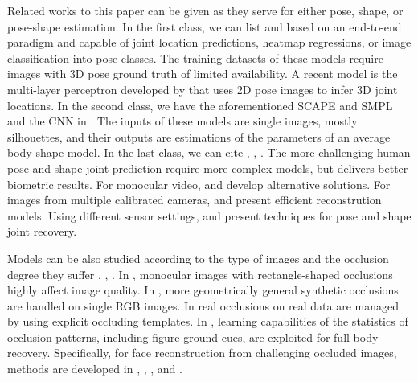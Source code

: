 \documentclass[]{interact}
\theoremstyle{plain}%
\theoremstyle{definition}
\theoremstyle{remark}
\begin{document}
Related works to this paper can be given as they serve for either pose, shape, or pose-shape estimation.  In the first class, we can list \citep{Li20143DHP, Mehta2016Monocular3H, Pavlakos2016CoarsetoFineVP} and \citep{Rogez2016MoCapguidedDA} based on an end-to-end paradigm and capable of joint location predictions, heatmap regressions, or image classification into pose classes. The training datasets of these models require images with 3D pose ground truth of limited availability. A recent model is the multi-layer perceptron developed by \citep{Martinez2017ASY} that uses 2D pose images to infer 3D joint locations. In the second class, we have the aforementioned SCAPE \citep{anguelov2005scape} and SMPL \citep{loper2015smpl} and the CNN in \citep{dibra2017human}. The inputs of these models are single images, mostly silhouettes, and their outputs are estimations of the parameters of an average body shape model. In the last class, we can cite \citep{Xu2017MonoPerfCapHP}, \citep{Alldieck2017OpticalF3}, \citep{Rhodin2016GeneralAH}. The more challenging human pose and shape joint prediction require more complex models, but delivers better biometric results. For monocular video, \citep{Xu2017MonoPerfCapHP} and \citep{Alldieck2017OpticalF3} develop alternative solutions. For images from multiple calibrated cameras, \citep{Rhodin2016GeneralAH} and \citep{Huang2017TowardsAM} present efficient reconstrution models. Using different sensor settings, \citep{Weiss2011Home3B} and \citep{Marcard2017SparseIP} present techniques for pose and shape joint recovery.

Models can be also studied according to the type of images and the occlusion degree they suffer \citep{huang2009estimating}, \citep{sarandi2018robust}, \citep{girshick2011object}. In \citep{huang2009estimating}, monocular images with rectangle-shaped occlusions highly affect image quality. In \citep{sarandi2018robust}, more geometrically general synthetic occlusions are handled on single RGB images. In \citep{girshick2011object} real occlusions on real data are managed by using explicit occluding templates. In \citep{ghiasi2014parsing}, learning capabilities of the statistics of occlusion patterns, including figure-ground cues, are exploited for full body recovery. Specifically, for face reconstruction from challenging occluded images, methods are developed in \citep{rafi2015semantic}, \citep{tran2018extreme}, \citep{yu2018generative}, and \citep{wu2018occluded}.
\end{document}
